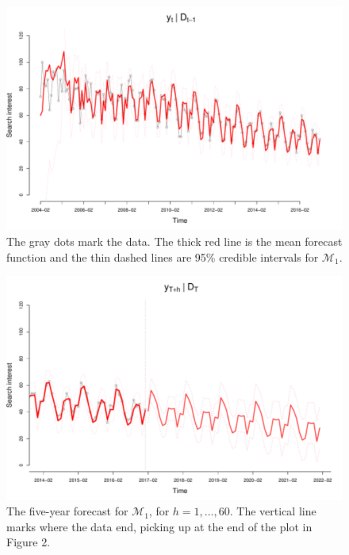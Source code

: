 \documentclass[12pt]{article}
\begin{document}
\begin{figure}[H]
\begin{center}
\includegraphics[scale=0.37]{figs/m1_onestep.pdf}
\end{center}
\caption{The gray dots mark the data. The thick red line is the mean forecast function and the thin dashed lines are 95\% credible intervals for $\mathcal{M}_1$.}
\end{figure}

\begin{figure}[H]
\begin{center}
\includegraphics[scale=0.37]{figs/m1_forecast.pdf}
\end{center}
\caption{The five-year forecast for $\mathcal{M}_1$, for $h=1,\ldots,60$. The vertical line marks where the data end, picking up at the end of the plot in Figure 2.}
\end{figure}
\end{document}
